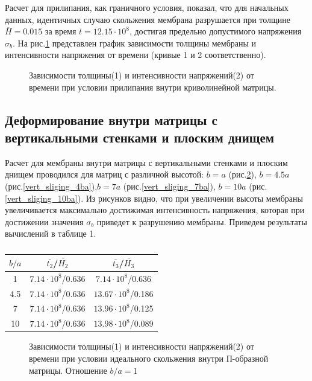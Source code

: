 Расчет для прилипания, как граничного условия,	показал, что для начальных данных, идентичных случаю скольжения 
	мембрана разрушается при толщине $\overline{H}=0.015$ за время $\overline{t}=12.15\cdot 10^8$, достигая предельно допустимого напряжения $\sigma_b$.    На рис.\ref{quad_sticking} представлен график зависимости толщины мембраны и интенсивности напряжения от времени (кривые 1 и 2 соответственно).
   
		\begin{figure}[h!]	
				\def\svgwidth{\columnwidth}
				\caption{Зависимости толщины(1) и интенсивности напряжений(2) от времени при условии прилипания внутри криволинейной матрицы. } 
				\label{quad_sticking}
		\end{figure}

\subsection{Деформирование внутри матрицы с вертикальными стенками и плоским днищем}
		
		Расчет для мембраны внутри матрицы с вертикальными стенками и плоским днищем проводился для матриц с различной высотой:
		$b = a$ (рис.\ref{vert_sliging_ba}), $b = 4.5a$ (рис.\ref{vert_sliging_4ba}),$b=7a$ (рис.\ref{vert_sliging_7ba}), $b=10a$ (рис.\ref{vert_sliging_10ba}). Из рисунков видно, что при увеличении высоты мембраны увеличивается максимально достижимая интенсивность напряжения, которая при достижении значения $\sigma_b$ приведет к разрушению мембраны. Приведем результаты вычислений в таблице 1.
\begin{table}
\begin{center}

\renewcommand{\arraystretch}{2}

\begin{tabular}{|c|c|c|}
\hline
$b/a$    & $\overline{t_2}$/$\overline{H_2}$ & $\overline{t_3}$/$\overline{H_3}$ \\
\hline\hline
1    & $7.14\cdot10^8$/0.636  & $7.14\cdot10^8$/0.636\\ \hline
4.5  & $7.14\cdot10^8$/0.636  & $13.67\cdot10^8$/0.186\\ \hline
7    & $7.14\cdot10^8$/0.636  & $13.96\cdot10^8$/0.125\\ \hline
10   & $7.14\cdot10^8$/0.636  & $13.98\cdot10^8$/0.089\\ \hline
\end{tabular}

\end{center}
\label{vert_table}
\caption{}
\end{table}				 
		\begin{figure}[h!]	
				\def\svgwidth{\columnwidth}
				\caption{Зависимости толщины(1) и интенсивности напряжений(2) от времени при условии идеального скольжения внутри П-образной матрицы. Отношение $b/a = 1$} 
				\label{vert_sliging_ba}
		\end{figure}

